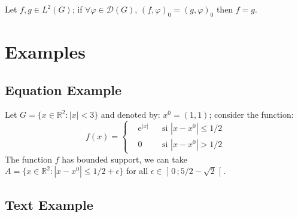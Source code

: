 \documentclass[
	11pt,
	fleqn,
	a4paper,
]{LegrandOrangeBook}
\begin{document}
\begin{proposition} %
    Let $f,g\in L^2(G)$; if $\forall \varphi\in\mathcal{D}(G)$, $(f,\varphi)_0=(g,\varphi)_0$ then $f = g$.
\end{proposition}


\section{Examples}

\subsection{Equation Example}

\begin{example} %
    Let $G=\{x\in\mathbb{R}^2:|x|<3\}$ and denoted by: $x^0=(1,1)$; consider the function:
    \begin{equation}
        f(x)=\left\{\begin{aligned}                                                                                                                                                                                                                                                                         & \mathrm{e}^{|x|} &  & \text{si $|x-x^0|\leq 1/2$} \\
                                                                                                                                                                                                                                                                                        & 0                &  & \text{si $|x-x^0|> 1/2$}\end{aligned}\right.
    \end{equation}
    The function $f$ has bounded support, we can take $A=\{x\in\mathbb{R}^2:|x-x^0|\leq 1/2+\epsilon\}$ for all $\epsilon\in\mathopen{]}0\,;5/2-\sqrt{2}\mathclose{[}$.
\end{example}

\subsection{Text Example}
\end{document}
